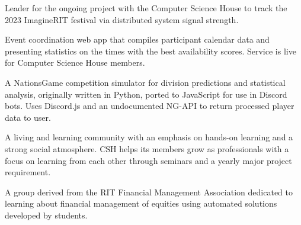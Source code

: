 \documentclass[10pt,a4paper,ragged2e,withhyper]{altacv}
\begin{document}
\begin{paracol}{2}


Leader for the ongoing project with the Computer Science House to track the 2023 ImagineRIT festival via distributed system signal strength.\par\vspace{.15cm}


\divider

Event coordination web app that compiles participant calendar data and presenting statistics on the times with the best availability scores.  Service is live for Computer Science House members.\par\vspace{.15cm}


\divider


A NationsGame competition simulator for division predictions and statistical analysis, originally written in Python, ported to JavaScript for use in Discord bots.  Uses Discord.js and an undocumented NG-API to return processed player data to user.\par\vspace{.15cm}

\medskip


A living and learning community with an emphasis on hands-on learning and a strong social atmosphere. CSH helps its members grow as professionals with a focus on learning from each other through seminars and a yearly major project requirement.

\divider

A group derived from the RIT Financial Management Association dedicated to learning about financial management of equities using automated solutions developed by students.


\end{paracol}
\end{document}

